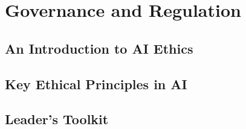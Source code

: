 \chapter{Governance and Regulation}
\label{chap:governance_and_regulation}

\section{An Introduction to AI Ethics}
\label{sec:ai_ethics_introduction}

\section{Key Ethical Principles in AI}
\label{sec:ethical_principles}

\section{Leader's Toolkit}
\label{sec:governance_leaders_toolkit}